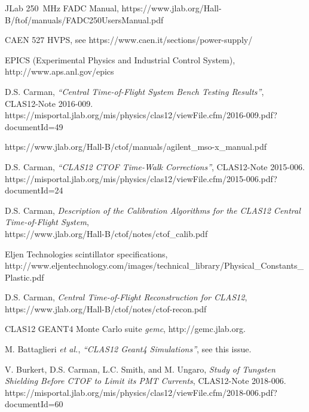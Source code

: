 \documentclass{elsart}
\begin{document}
\begin{thebibliography}{99}
JLab 250~MHz FADC Manual, https://www.jlab.org/Hall-B/ftof/manuals/FADC250UsersManual.pdf
  
CAEN 527 HVPS, see https://www.caen.it/sections/power-supply/
  
EPICS (Experimental Physics and Industrial Control System),\\ http://www.aps.anl.gov/epics

D.S. Carman, {\it ``Central Time-of-Flight System Bench Testing Results''},\\
CLAS12-Note 2016-009.\\
https://misportal.jlab.org/mis/physics/clas12/viewFile.cfm/2016-009.pdf?documentId=49

https://www.jlab.org/Hall-B/ctof/manuals/agilent\_mso-x\_manual.pdf

D.S. Carman, {\it ``CLAS12 CTOF Time-Walk Corrections''}, CLAS12-Note 2015-006.\\
https://misportal.jlab.org/mis/physics/clas12/viewFile.cfm/2015-006.pdf?documentId=24

D.S. Carman, {\it Description of the Calibration Algorithms for the CLAS12 Central Time-of-Flight System},\\
https://www.jlab.org/Hall-B/ctof/notes/ctof\_calib.pdf

Eljen Technologies scintillator specifications,\\
http://www.eljentechnology.com/images/technical\_library/Physical\_Constants\_Plastic.pdf

D.S. Carman, {\it Central Time-of-Flight Reconstruction for CLAS12},\\
https://www.jlab.org/Hall-B/ctof/notes/ctof-recon.pdf

CLAS12 GEANT4 Monte Carlo suite {\it gemc}, http://gemc.jlab.org.

M. Battaglieri {\it et al.}, {\it ``CLAS12 Geant4 Simulations''}, see this issue.
  
V. Burkert, D.S. Carman, L.C. Smith, and M. Ungaro, {\it Study of Tungsten Shielding Before CTOF to Limit
its PMT Currents}, CLAS12-Note 2018-006.\\
https://misportal.jlab.org/mis/physics/clas12/viewFile.cfm/2018-006.pdf?documentId=60
  
\end{thebibliography}
\end{document}
